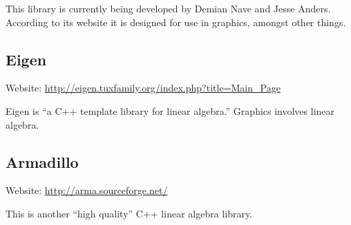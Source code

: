 This library is currently being developed by Demian Nave and Jesse Anders.
According to its website it is designed for use in graphics, amongst other things.

\subsection{Eigen}
Website: \url{http://eigen.tuxfamily.org/index.php?title=Main_Page}

Eigen is ``a C++ template library for linear algebra.''
Graphics involves linear algebra.

\subsection{Armadillo}
Website: \url{http://arma.sourceforge.net/}

This is another ``high quality'' C++ linear algebra library.
